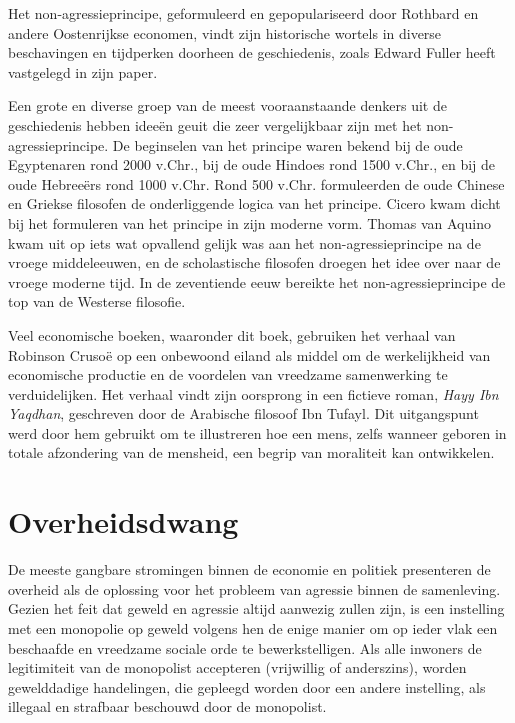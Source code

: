 Het non-agressieprincipe, geformuleerd en gepopulariseerd door Rothbard en andere Oostenrijkse economen, vindt zijn historische wortels in diverse beschavingen en tijdperken doorheen de geschiedenis, zoals Edward Fuller heeft vastgelegd in zijn paper.

\begin{blockquotebox}
Een grote en diverse groep van de meest vooraanstaande denkers uit de geschiedenis hebben ideeën geuit die zeer vergelijkbaar zijn met het non-agressieprincipe. De beginselen van het principe waren bekend bij de oude Egyptenaren rond 2000 v.Chr., bij de oude Hindoes rond 1500 v.Chr., en bij de oude Hebreeërs rond 1000 v.Chr. Rond 500 v.Chr. formuleerden de oude Chinese en Griekse filosofen de onderliggende logica van het principe. Cicero kwam dicht bij het formuleren van het principe in zijn moderne vorm. Thomas van Aquino kwam uit op iets wat opvallend gelijk was aan het non-agressieprincipe na de vroege middeleeuwen, en de scholastische filosofen droegen het idee over naar de vroege moderne tijd. In de zeventiende eeuw bereikte het non-agressieprincipe de top van de Westerse filosofie.\footnotemark
\end{blockquotebox}

Veel economische boeken, waaronder dit boek, gebruiken het verhaal van Robinson Crusoë op een onbewoond eiland als middel om de werkelijkheid van economische productie en de voordelen van vreedzame samenwerking te verduidelijken. Het verhaal vindt zijn oorsprong in een fictieve roman, \emph{Hayy Ibn Yaqdhan}, geschreven door de Arabische filosoof Ibn Tufayl. Dit uitgangspunt werd door hem gebruikt om te illustreren hoe een mens, zelfs wanneer geboren in totale afzondering van de mensheid, een begrip van moraliteit kan ontwikkelen.

\hypertarget{overheidsdwang}{%
\section{Overheidsdwang}\label{overheidsdwang}}

De meeste gangbare stromingen binnen de economie en politiek presenteren de overheid als de oplossing voor het probleem van agressie binnen de samenleving. Gezien het feit dat geweld en agressie altijd aanwezig zullen zijn, is een instelling met een monopolie op geweld volgens hen de enige manier om op ieder vlak een beschaafde en vreedzame sociale orde te bewerkstelligen. Als alle inwoners de legitimiteit van de monopolist accepteren (vrijwillig of anderszins), worden gewelddadige handelingen, die gepleegd worden door een andere instelling, als illegaal en strafbaar beschouwd door de monopolist.

